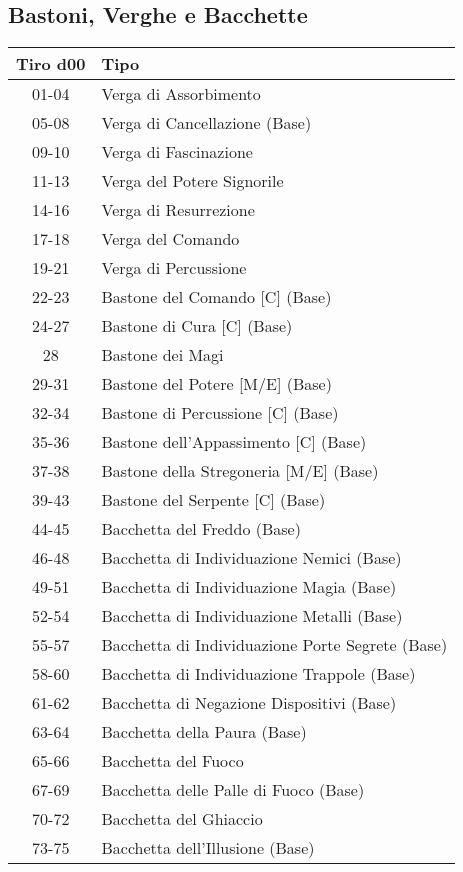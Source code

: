 \documentclass{article}
\begin{document}
\begin{multicols}{2}
\section{Bastoni, Verghe e Bacchette}

\begin{tabular}{|c|l|}
\hline
\textbf{Tiro d00} & \textbf{Tipo} \\
\hline
01-04 & Verga di Assorbimento \\
05-08 & Verga di Cancellazione (Base) \\
09-10 & Verga di Fascinazione \\
11-13 & Verga del Potere Signorile \\
14-16 & Verga di Resurrezione \\
17-18 & Verga del Comando \\
19-21 & Verga di Percussione \\
22-23 & Bastone del Comando [C] (Base) \\
24-27 & Bastone di Cura [C] (Base) \\
28 & Bastone dei Magi \\
29-31 & Bastone del Potere [M/E] (Base) \\
32-34 & Bastone di Percussione [C] (Base) \\
35-36 & Bastone dell'Appassimento [C] (Base) \\
37-38 & Bastone della Stregoneria [M/E] (Base) \\
39-43 & Bastone del Serpente [C] (Base) \\
44-45 & Bacchetta del Freddo (Base) \\
46-48 & Bacchetta di Individuazione Nemici (Base) \\
49-51 & Bacchetta di Individuazione Magia (Base) \\
52-54 & Bacchetta di Individuazione Metalli (Base) \\
55-57 & Bacchetta di Individuazione Porte Segrete (Base) \\
58-60 & Bacchetta di Individuazione Trappole (Base) \\
61-62 & Bacchetta di Negazione Dispositivi (Base) \\
63-64 & Bacchetta della Paura (Base) \\
65-66 & Bacchetta del Fuoco \\
67-69 & Bacchetta delle Palle di Fuoco (Base) \\
70-72 & Bacchetta del Ghiaccio \\
73-75 & Bacchetta dell'Illusione (Base) \\

\end{tabular}
\end{multicols}
\end{document}
